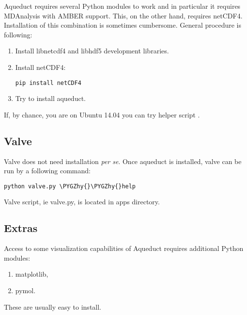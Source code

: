 \documentclass[a4paper,10pt,english]{sphinxmanual}
\def\PYGZhy{\char`\-}
\begin{document}
Aqueduct requires several Python modules to work and in particular it requires MDAnalysis with AMBER support. This, on the other hand, requires netCDF4. Installation of this combination is sometimes cumbersome. General procedure is following:
\begin{enumerate}
\item {} 
Install libnetcdf4 and libhdf5 development libraries.

\item {} 
Install netCDF4:

\begin{Verbatim}[commandchars=\\\{\}]
pip install netCDF4
\end{Verbatim}

\item {} 
Try to install aqueduct.

\end{enumerate}

If, by chance, you are on Ubuntu 14.04 you can try helper script .


\subsection{Valve}
\label{aqueduct_install:valve}
Valve does not need installation \emph{per se}. Once aqueduct is installed, valve can be run by a following command:

\begin{Verbatim}[commandchars=\\\{\}]
python valve.py \PYGZhy{}\PYGZhy{}help
\end{Verbatim}

Valve script, ie valve.py, is located in apps directory.


\subsection{Extras}
\label{aqueduct_install:extras}
Access to some visualization capabilities of Aqueduct requires additional Python modules:
\begin{enumerate}
\item {} 
matplotlib,

\item {} 
pymol.

\end{enumerate}

These are usually easy to install.
\end{document}
